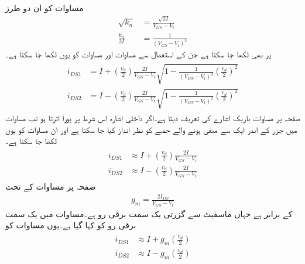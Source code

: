 مساوات  کو ان دو طرز
\begin{align*}
\sqrt{k_n}&=\frac{\sqrt{2I}}{V_{GS}-V_t}\\
\frac{k_n}{2I}&=\frac{1}{\left(V_{GS}-V_t \right)^2}
\end{align*}
پر بھی لکھا جا سکتا ہے جن کے استعمال سے  مساوات  اور مساوات 
کو یوں لکھا جا سکتا ہے۔
\begin{gather}
\begin{aligned}\label{مساوات_تفرقی_دونوں_ماسفیٹ_کا_برقی_رو}
i_{DS1}&=I+\left(\frac{v_d}{2}\right) \frac{2I}{V_{GS}-V_t} \sqrt{1-\frac{1}{\left(V_{GS}-V_t \right)^2} \left(\frac{v_d}{2} \right)^2}\\
i_{DS2}&=I-\left(\frac{v_d}{2}\right) \frac{2I}{V_{GS}-V_t} \sqrt{1-\frac{1}{\left(V_{GS}-V_t \right)^2} \left(\frac{v_d}{2} \right)^2}
\end{aligned}
\end{gather}
صفحہ  پر مساوات  باریک اشارے کی تعریف
   دیتا ہے۔اگر داخلی اشارہ اس شرط پر پورا اترتا ہو تب  مساوات  میں  جزر    کے اندر ایک سے منفی ہونے والے حصے کو نظر انداز کیا جا سکتا ہے اور ان مساوات کو یوں لکھا جا سکتا ہے۔
\begin{gather}
\begin{aligned}\label{مساوات_تفرقی_دونوں_ماسفیٹ_کا_برقی_رو_خطی_مساوات}
i_{DS1}& \approx I+\left(\frac{v_d}{2}\right) \frac{2I}{V_{GS}-V_t} \\
i_{DS2}& \approx I-\left(\frac{v_d}{2}\right) \frac{2I}{V_{GS}-V_t}
\end{aligned}
\end{gather}
صفحہ  پر مساوات  کے تحت
\begin{align*}
g_m=\frac{2 I_{DS}}{V_{GS}-V_t}
\end{align*}
کے برابر ہے جہاں  ماسفیٹ سے گزرتی یک سمت برقی رو ہے۔مساوات  میں یک سمت برقی رو کو  کہا گیا ہے۔یوں مساوات  کو
\begin{gather}
\begin{aligned}\label{مساوات_تفرقی_دونوں_ماسفیٹ_کا_برقی_رو_خطی_مساوات_الف}
i_{DS1}& \approx I+g_m \left(\frac{v_d}{2}\right) \\
i_{DS2}& \approx I-g_m \left(\frac{v_d}{2}\right)
\end{aligned}
\end{gather}
